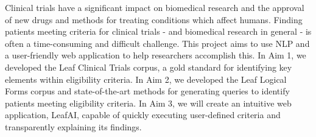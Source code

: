 \documentclass[../main.tex]{subfiles}
\begin{document}
Clinical trials have a significant impact on biomedical research and the approval of new drugs and methods for treating conditions which affect humans. Finding patients meeting criteria for clinical trials - and biomedical research in general - is often a time-consuming and difficult challenge. This project aims to use NLP and a user-friendly web application to help researchers accomplish this. In Aim 1, we developed the Leaf Clinical Trials corpus, a gold standard for identifying key elements within eligibility criteria. In Aim 2, we developed the Leaf Logical Forms corpus and state-of-the-art methods for generating queries to identify patients meeting eligibility criteria. In Aim 3, we will create an intuitive web application, LeafAI, capable of quickly executing user-defined criteria and transparently explaining its findings.
\end{document}
